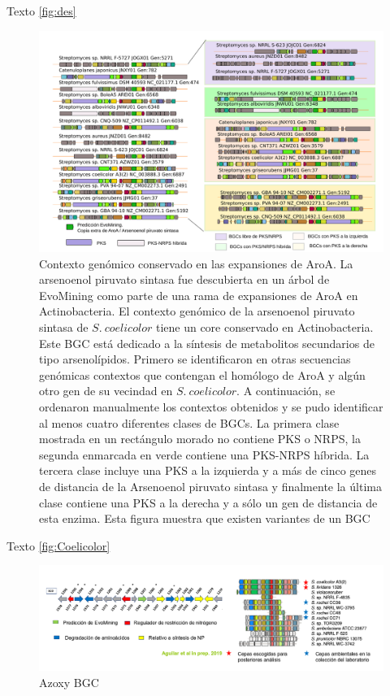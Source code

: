 \documentclass[12pt,twoside]{reedthesis}
\begin{document}
  Texto \autoref{fig:des}
  
  \begin{figure}[h!tbp]
  \centering
  \includegraphics[angle = 0,scale = .4]{chapter3/Coelicolor.pdf}
  \caption[EvoMining Algorithm]{\footnotesize{Contexto genómico conservado en las expansiones de AroA. La arsenoenol piruvato sintasa fue descubierta en un árbol de EvoMining como parte de una rama de expansiones de AroA en Actinobacteria. El contexto genómico de la arsenoenol piruvato sintasa de $S.~coelicolor$ tiene un core conservado en Actinobacteria. Este BGC está dedicado a la síntesis de metabolitos secundarios de tipo arsenolípidos. Primero se identificaron en otras secuencias genómicas contextos que contengan el homólogo de AroA y algún otro gen de su vecindad en $S.~coelicolor$. A continuación, se ordenaron manualmente los contextos obtenidos y se pudo identificar al menos cuatro diferentes clases de BGCs. La primera clase mostrada en un rectángulo morado no contiene PKS o NRPS, la segunda enmarcada en verde contiene una PKS-NRPS híbrida. La tercera clase incluye una PKS a la izquierda y a más de cinco genes de distancia de la Arsenoenol piruvato sintasa y finalmente la última clase contiene una PKS a la derecha y a sólo un gen de distancia de esta enzima. Esta figura muestra que existen variantes de un BGC }}
  \label{fig:Coelicolor}
  \end{figure}
  
  Texto \autoref{fig:Coelicolor}
  
  \begin{figure}[h!tbp]
  \centering
  \includegraphics[angle = 0,scale = .4]{chapter3/azoxy.png}
  \caption[EvoMining Algorithm]{\footnotesize{Azoxy BGC}}
  \label{fig:azoxy}
  \end{figure}
  
\end{document}
